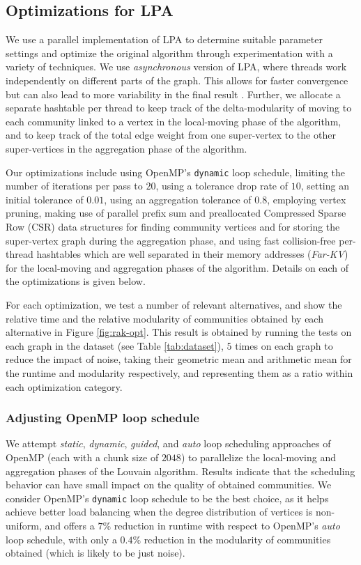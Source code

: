 \subsection{Optimizations for LPA}
\label{sec:lpa}

We use a parallel implementation of LPA to determine suitable parameter settings and optimize the original algorithm through experimentation with a variety of techniques. We use \textit{asynchronous} version of LPA, where threads work independently on different parts of the graph. This allows for faster convergence but can also lead to more variability in the final result \cite{com-blondel08, com-halappanavar17}. Further, we allocate a separate hashtable per thread to keep track of the delta-modularity of moving to each community linked to a vertex in the local-moving phase of the algorithm, and to keep track of the total edge weight from one super-vertex to the other super-vertices in the aggregation phase of the algorithm.

Our optimizations include using OpenMP's \verb|dynamic| loop schedule, limiting the number of iterations per pass to $20$, using a tolerance drop rate of $10$, setting an initial tolerance of $0.01$, using an aggregation tolerance of $0.8$, employing vertex pruning, making use of parallel prefix sum and preallocated Compressed Sparse Row (CSR) data structures for finding community vertices and for storing the super-vertex graph during the aggregation phase, and using fast collision-free per-thread hashtables which are well separated in their memory addresses (\textit{Far-KV}) for the local-moving and aggregation phases of the algorithm. Details on each of the optimizations is given below.

For each optimization, we test a number of relevant alternatives, and show the relative time and the relative modularity of communities obtained by each alternative in Figure \ref{fig:rak-opt}. This result is obtained by running the tests on each graph in the dataset (see Table \ref{tab:dataset}), $5$ times on each graph to reduce the impact of noise, taking their geometric mean and arithmetic mean for the runtime and modularity respectively, and representing them as a ratio within each optimization category.


\subsubsection{Adjusting OpenMP loop schedule}

We attempt \textit{static}, \textit{dynamic}, \textit{guided}, and \textit{auto} loop scheduling approaches of OpenMP (each with a chunk size of $2048$) to parallelize the local-moving and aggregation phases of the Louvain algorithm. Results indicate that the scheduling behavior can have small impact on the quality of obtained communities. We consider OpenMP's \verb|dynamic| loop schedule to be the best choice, as it helps achieve better load balancing when the degree distribution of vertices is non-uniform, and offers a $7\%$ reduction in runtime with respect to OpenMP's \textit{auto} loop schedule, with only a $0.4\%$ reduction in the modularity of communities obtained (which is likely to be just noise).

